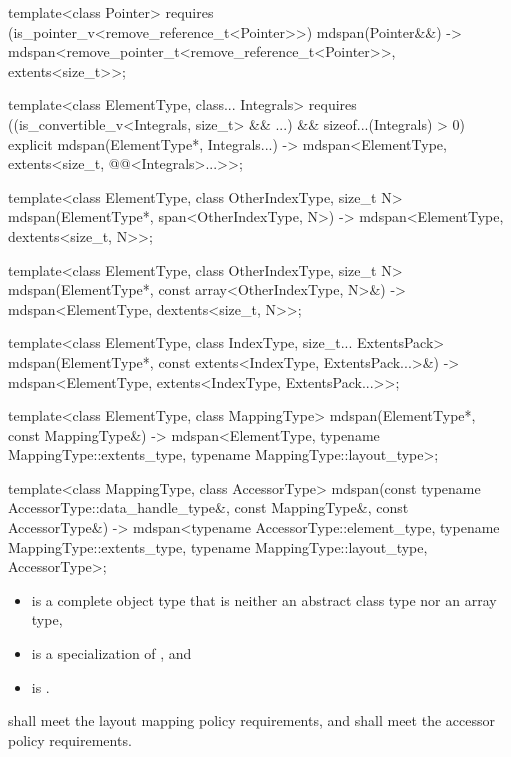 \begin{codeblock}
{  template<class Pointer>
    requires (is_pointer_v<remove_reference_t<Pointer>>)
    mdspan(Pointer&&)
      -> mdspan<remove_pointer_t<remove_reference_t<Pointer>>, extents<size_t>>;

  template<class ElementType, class... Integrals>
    requires ((is_convertible_v<Integrals, size_t> && ...) && sizeof...(Integrals) > 0)
    explicit mdspan(ElementType*, Integrals...)
      -> mdspan<ElementType, extents<size_t, @@<Integrals>...>>;

  template<class ElementType, class OtherIndexType, size_t N>
    mdspan(ElementType*, span<OtherIndexType, N>)
      -> mdspan<ElementType, dextents<size_t, N>>;

  template<class ElementType, class OtherIndexType, size_t N>
    mdspan(ElementType*, const array<OtherIndexType, N>&)
      -> mdspan<ElementType, dextents<size_t, N>>;

  template<class ElementType, class IndexType, size_t... ExtentsPack>
    mdspan(ElementType*, const extents<IndexType, ExtentsPack...>&)
      -> mdspan<ElementType, extents<IndexType, ExtentsPack...>>;

  template<class ElementType, class MappingType>
    mdspan(ElementType*, const MappingType&)
      -> mdspan<ElementType, typename MappingType::extents_type,
                typename MappingType::layout_type>;

  template<class MappingType, class AccessorType>
    mdspan(const typename AccessorType::data_handle_type&, const MappingType&,
           const AccessorType&)
      -> mdspan<typename AccessorType::element_type, typename MappingType::extents_type,
                typename MappingType::layout_type, AccessorType>;
}
\end{codeblock}

\pnum
\mandates
\begin{itemize}
\item
{} is a complete object type
that is neither an abstract class type nor an array type,
\item
{} is a specialization of , and
\item
{}
is .
\end{itemize}

\pnum
{} shall meet
the layout mapping policy requirements, and
 shall meet
the accessor policy requirements.

